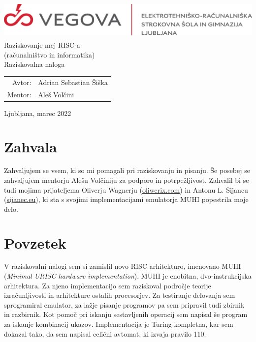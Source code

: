\documentclass[12pt]{article}
\begin{document}
\linespread{1.25}
\begin{titlepage}
  \begin{center}
    \includegraphics[height=2cm]{slike/vegova.png}\\
    \Huge
    \vspace*{6cm}
    Raziskovanje mej RISC-a\\
    \Large
    (računalništvo in informatika)\\
    Raziskovalna naloga\\
  \end{center}
  \vspace{8cm}
  \begin{tabular}{rl}
    Avtor: & Adrian Sebastian Šiška\\
    Mentor: & Aleš Volčini
  \end{tabular}
  \vspace{1cm}
  \begin{center}
    Ljubljana, marec 2022
  \end{center}
\end{titlepage}

\pagebreak

\tableofcontents

\pagebreak

\listoffigures

\pagebreak

\section{Zahvala}
Zahvaljujem se vsem, ki so mi pomagali pri raziskovanju in pisanju.
Še posebej se zahvaljujem mentorju Alešu Volčiniju za podporo in potrpežljivost.
Zahvalil bi se tudi mojima prijateljema Oliverju Wagnerju (\url{oliwerix.com}) in Antonu L. Šijancu (\url{sijanec.eu}), ki sta s svojimi implementacijami emulatorja MUHI popestrila moje delo.


\pagebreak


\section{Povzetek}
V raziskovalni nalogi sem si zamislil novo RISC arhitekturo, imenovano MUHI (\textit{Minimal URISC hardware implementation}).
MUHI je enobitna, dvo-instrukcijska arhitektura.
Za njeno implementacijo sem raziskoval področje teorije izračunljivosti in arhitekture ostalih procesorjev.
Za testiranje delovanja sem sprogramiral emulator, za lažje pisanje programov pa sem pripravil tudi zbirnik in razbirnik.
Kot pomoč pri iskanju sestavljenih operacij sem napisal še program za iskanje kombinacij ukazov.
Implementacija je Turing-kompletna, kar sem dokazal tako, da sem napisal celični avtomat, ki izvaja pravilo 110.
\end{document}
